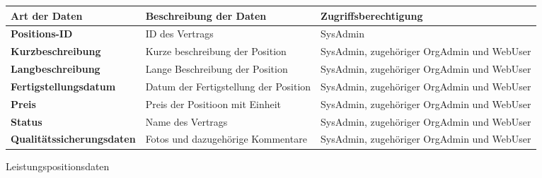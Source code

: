\begin{figure}[h]
	\centering
	\begin{tabularx}{\textwidth}{| X || X | X |}
        \hline
		\textbf{Art der Daten} & \textbf{Beschreibung der Daten} & \textbf{Zugriffsberechtigung} \\ \hline \hline
		\textbf{Positions-ID} & ID des Vertrags & SysAdmin \\ \hline
        \textbf{Kurzbeschreibung} & Kurze beschreibung der Position & SysAdmin, zugehöriger OrgAdmin und WebUser \\ \hline
        \textbf{Langbeschreibung} & Lange Beschreibung der Position & SysAdmin, zugehöriger OrgAdmin und WebUser \\ \hline
        \textbf{Fertigstellungsdatum} & Datum der Fertigstellung der Position & SysAdmin, zugehöriger OrgAdmin und WebUser \\ \hline
        \textbf{Preis} & Preis der Positioon mit Einheit & SysAdmin, zugehöriger OrgAdmin und WebUser \\ \hline
		\textbf{Status} & Name des Vertrags & SysAdmin, zugehöriger OrgAdmin und WebUser \\ \hline
		\textbf{Qualitätssicherungsdaten} & Fotos und dazugehörige Kommentare & SysAdmin, zugehöriger OrgAdmin und WebUser \\ \hline
	\end{tabularx}
	\caption{Leistungspositionsdaten}
	\label{fig:Leistungspositionsdaten}
\end{figure}